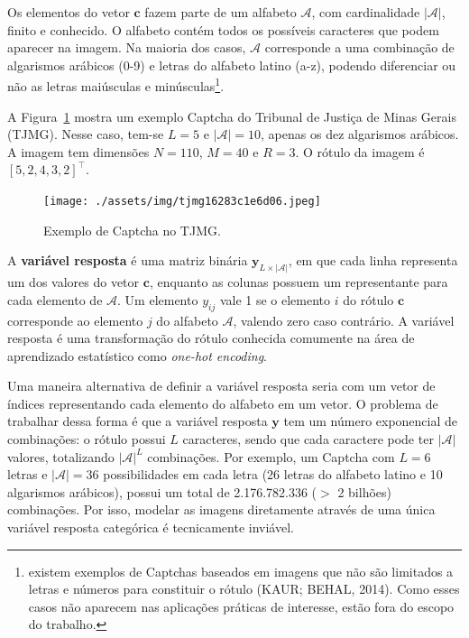 \documentclass[12pt,twoside,brazilian]{book}
\begin{document}
Os elementos do vetor \(\mathbf c\) fazem parte de um alfabeto
\(\mathcal A\), com cardinalidade \(|\mathcal A|\), finito e conhecido.
O alfabeto contém todos os possíveis caracteres que podem aparecer na
imagem. Na maioria dos casos, \(\mathcal A\) corresponde a uma
combinação de algarismos arábicos (0-9) e letras do alfabeto latino
(a-z), podendo diferenciar ou não as letras maiúsculas e
minúsculas\footnote{existem exemplos de Captchas baseados em imagens que
  não são limitados a letras e números para constituir o rótulo (KAUR;
  BEHAL, 2014). Como esses casos não aparecem nas aplicações práticas de
  interesse, estão fora do escopo do trabalho.}.

A Figura~\ref{fig-exemplo-tjmg} mostra um exemplo Captcha do Tribunal de
Justiça de Minas Gerais (TJMG). Nesse caso, tem-se \(L=5\) e
\(|\mathcal A|=10\), apenas os dez algarismos arábicos. A imagem tem
dimensões \(N=110\), \(M=40\) e \(R=3\). O rótulo da imagem é
\([5,2,4,3,2]^\top\).

\begin{figure}

{\centering \texttt{[image: ./assets/img/tjmg16283c1e6d06.jpeg]}

}

\caption{\label{fig-exemplo-tjmg}Exemplo de Captcha no TJMG.}

\end{figure}

A \textbf{variável resposta} é uma matriz binária
\(\mathbf y_{L \times |\mathcal A|}\), em que cada linha representa um
dos valores do vetor \(\mathbf c\), enquanto as colunas possuem um
representante para cada elemento de \(\mathcal A\). Um elemento
\(y_{ij}\) vale 1 se o elemento \(i\) do rótulo \(\mathbf c\)
corresponde ao elemento \(j\) do alfabeto \(\mathcal A\), valendo zero
caso contrário. A variável resposta é uma transformação do rótulo
conhecida comumente na área de aprendizado estatístico como
\emph{one-hot encoding}.

Uma maneira alternativa de definir a variável resposta seria com um
vetor de índices representando cada elemento do alfabeto em um vetor. O
problema de trabalhar dessa forma é que a variável resposta
\(\mathbf y\) tem um número exponencial de combinações: o rótulo possui
\(L\) caracteres, sendo que cada caractere pode ter \(|\mathcal A|\)
valores, totalizando \(|\mathcal A|^L\) combinações. Por exemplo, um
Captcha com \(L=6\) letras e \(|\mathcal A| = 36\) possibilidades em
cada letra (26 letras do alfabeto latino e 10 algarismos arábicos),
possui um total de 2.176.782.336 (\(>\) 2 bilhões) combinações. Por
isso, modelar as imagens diretamente através de uma única variável
resposta categórica é tecnicamente inviável.
\end{document}
